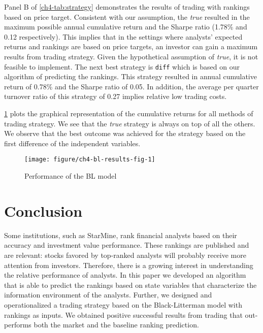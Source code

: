 \documentclass{llncs}\usepackage[]{graphicx}\usepackage[]{color}
\newenvironment{knitrout}{}{} %
\newcommand{\true}{\textit{true}}
\newcommand{\diff}{\texttt{diff}}
\begin{document}
Panel B of \ref{ch4-tab:strategy} demonstrates the results of trading with rankings based on price target. Consistent with our assumption, the \true{} resulted in the maximum possible annual cumulative return and the Sharpe ratio (1.78\% and  0.12 respectively). This implies that in the settings where analysts' expected returns and rankings are based on price targets, an investor can gain a maximum results from trading strategy. Given the hypothetical assumption of \true{}, it is not feasible to implement. The next best strategy is
\diff{}
which is based on our algorithm of predicting the rankings. This strategy resulted in annual cumulative return of 0.78\% and the Sharpe ratio of 0.05. In addition, the average per quarter turnover ratio of this strategy of 0.27 implies relative low trading costs.


\ref{ch4-fig:bl-results} plots the graphical representation of the cumulative returns for all methods of trading strategy. We see that the \true{} strategy is always on top of all the others. We observe that the best outcome was achieved for the strategy based on the first difference of the independent variables.

\begin{figure}
\begin{center}
\begin{knitrout}
\color{fgcolor}
\texttt{[image: figure/ch4-bl-results-fig-1]} 

\end{knitrout}
\end{center}
\caption{Performance of the BL model}
\label{ch4-fig:bl-results}
\end{figure}


\section{Conclusion}
\label{ch4-sec:conclusion}
Some institutions, such as StarMine, rank financial analysts based on their accuracy and investment value performance. These rankings are published and are relevant: stocks favored by top-ranked analysts will probably receive more attention from investors. Therefore, there is a growing interest in understanding the relative performance of analysts. In this paper we developed an algorithm that is able to predict the rankings based on state variables that characterize the information environment of the analysts. Further, we designed and operationalized a trading strategy based on the Black-Litterman model with rankings as inputs. We obtained positive successful results from trading that out-performs both the market and the baseline ranking prediction.










%
%

\end{document}
